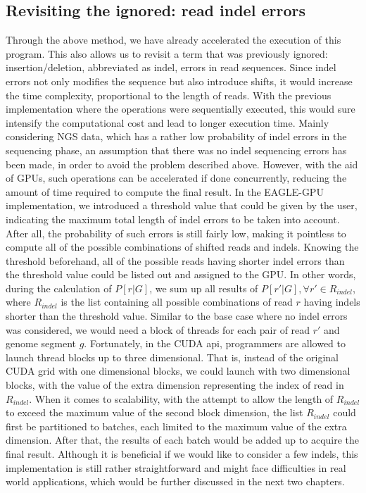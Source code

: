 \documentclass{PHlab-thesis}
\begin{document}
\subsection{Revisiting the ignored: read indel errors}
Through the above method, we have already accelerated the execution of this program. This also allows us to revisit a term that was previously ignored: insertion/deletion, abbreviated as indel, errors in read sequences. Since indel errors not only modifies the sequence but also introduce shifts, it would increase the time complexity, proportional to the length of reads. With the previous implementation where the operations were sequentially executed, this would sure intensify the computational cost and lead to longer execution time. Mainly considering NGS data, which has a rather low probability of indel errors in the sequencing phase, an assumption that there was no indel sequencing errors has been made, in order to avoid the problem described above. However, with the aid of GPUs, such operations can be accelerated if done concurrently, reducing the amount of time required to compute the final result. In the EAGLE-GPU implementation, we introduced a threshold value that could be given by the user, indicating the maximum total length of indel errors to be taken into account. After all, the probability of such errors is still fairly low, making it pointless to compute all of the possible combinations of shifted reads and indels. Knowing the threshold beforehand, all of the possible reads having shorter indel errors than the threshold value could be listed out and assigned to the GPU. In other words, during the calculation of $P[r|G]$, we sum up all results of $P[r'|G], \forall r' \in R_{indel}$, where $R_{indel}$ is the list containing all possible combinations of read $r$ having indels shorter than the threshold value. Similar to the base case where no indel errors was considered, we would need a block of threads for each pair of read $r'$ and genome segment $g$. Fortunately, in the CUDA api, programmers are allowed to launch thread blocks up to three dimensional. That is, instead of the original CUDA grid with one dimensional blocks, we could launch with two dimensional blocks, with the value of the extra dimension representing the index of read in $R_{indel}$. When it comes to scalability, with the attempt to allow the length of $R_{indel}$ to exceed the maximum value of the second block dimension, the list $R_{indel}$ could first be partitioned to batches, each limited to the maximum value of the extra dimension. After that, the results of each batch would be added up to acquire the final result. Although it is beneficial if we would like to consider a few indels, this implementation is still rather straightforward and might face difficulties in real world applications, which would be further discussed in the next two chapters.
\end{document}

